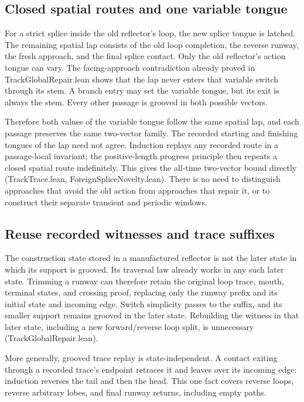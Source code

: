 \documentclass[11pt]{article}
\theoremstyle{definition}
\newcommand{\file}[1]{\textsf{#1}}
\begin{document}
\subsection{Closed spatial routes and one variable tongue}

For a strict splice inside the old reflector's loop, the new splice tongue
is latched. The remaining spatial lap consists of the old loop completion,
the reverse runway, the fresh approach, and the final splice contact. Only
the old reflector's action tongue can vary. The facing-approach contradiction
already proved in \file{TrackGlobalRepair.lean} shows that the lap never
enters that variable switch through its stem. A branch entry may set the
variable tongue, but its exit is always the stem. Every other passage is
grooved in both possible vectors.

Therefore both values of the variable tongue follow the same spatial lap,
and each passage preserves the same two-vector family. The recorded starting
and finishing tongues of the lap need not agree. Induction replays any
recorded route in a passage-local invariant; the positive-length progress
principle then repeats a closed spatial route indefinitely. This gives the
all-time two-vector bound directly
(\file{TrackTrace.lean}, \file{ForeignSpliceNovelty.lean}). There is no need
to distinguish approaches that avoid the old action from approaches that
repair it, or to construct their separate transient and periodic windows.

\subsection{Reuse recorded witnesses and trace suffixes}

The construction state stored in a manufactured reflector is not the
later state in which its support is grooved. Its traversal law already
works in any such later state. Trimming a runway can therefore retain the
original loop trace, mouth, terminal states, and crossing proof, replacing
only the runway prefix and its initial state and incoming edge.
Switch simplicity passes to the suffix, and its smaller support remains
grooved in the later state. Rebuilding the witness in that later state,
including a new forward/reverse loop split, is unnecessary
(\file{TrackGlobalRepair.lean}).

More generally, grooved trace replay is state-independent. A contact
exiting through a recorded trace's endpoint retraces it and leaves over
its incoming edge: induction reverses the tail and then the head.
This one fact covers reverse loops, reverse arbitrary lobes, and final
runway returns, including empty paths.
\end{document}
